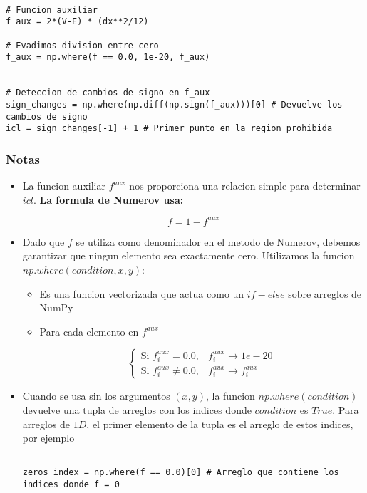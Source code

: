 \documentclass[11pt]{article}
\begin{document}
\begin{verbatim}

# Funcion auxiliar
f_aux = 2*(V-E) * (dx**2/12)

# Evadimos division entre cero
f_aux = np.where(f == 0.0, 1e-20, f_aux)


# Deteccion de cambios de signo en f_aux
sign_changes = np.where(np.diff(np.sign(f_aux)))[0] # Devuelve los cambios de signo
icl = sign_changes[-1] + 1 # Primer punto en la region prohibida

\end{verbatim}
\subsubsection{Notas}
\label{sec:orgc201c8f}

\begin{itemize}
\item La funcion auxiliar \(f^{aux}\) nos proporciona una relacion simple para determinar \(icl\). \textbf{La formula de Numerov usa:}

\[ f = 1 - f^{aux} \]

\item Dado que \(f\) se utiliza como denominador en el metodo de Numerov, debemos garantizar que ningun elemento sea exactamente cero. Utilizamos la funcion \(np.where(condition, x, y)\):

\begin{itemize}
\item Es una funcion vectorizada que actua como un \(if-else\) sobre arreglos de NumPy

\item Para cada elemento en \(f^{aux}\)

\[\begin{cases}\text{Si } f^{aux}_i = 0.0, & f^{aux}_i \to 1e-20 \\ \text{Si } f^{aux}_{i} \neq 0.0, & f^{aux}_i \to f^{aux}_{i}\end{cases}\]
\end{itemize}

\item Cuando se usa sin los argumentos \((x,y)\), la funcion \(np.where(condition)\) devuelve una tupla de arreglos con los indices donde \(condition\) es \(True\). Para arreglos de \(1D\), el primer elemento de la tupla es el arreglo de estos indices, por ejemplo

\begin{verbatim}

zeros_index = np.where(f == 0.0)[0] # Arreglo que contiene los indices donde f = 0


\end{verbatim}
\end{itemize}
\end{document}
